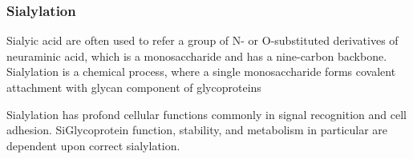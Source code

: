 \subsubsection {Sialylation}
Sialyic acid are often used to refer a group of N- or O-substituted derivatives of neuraminic acid, which is a monosaccharide and has a nine-carbon backbone.~\cite{Vocadlo_2009} Sialylation is a chemical process, where a single monosaccharide forms covalent attachment with glycan component of glycoproteins

Sialylation has profond cellular functions commonly in signal recognition and cell adhesion. SiGlycoprotein function, stability, and metabolism in particular are dependent upon correct sialylation.